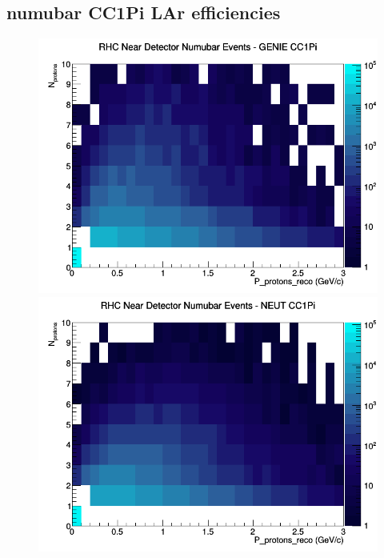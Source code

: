 \documentclass[12pt]{article}
\begin{document}
\subsection{numubar CC1Pi LAr efficiencies}
\begin{figure}[h]
\includegraphics[width=\linewidth]{eff_N_P/LAr/protons/CC1Pi_RHC_ND_numubar_N_P_GENIE.png}
\endminipage
{}
\includegraphics[width=\linewidth]{eff_N_P/LAr/protons/CC1Pi_RHC_ND_numubar_N_P_NEUT.png}
\endminipage
{}

\end{figure}
\end{document}
